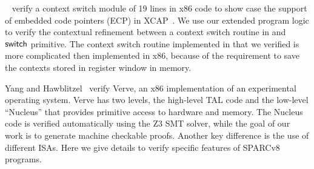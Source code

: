 ~\cite{ctxm} verify a context switch module of 19 lines
in x86 code to show case the support of embedded
code pointers (ECP) in XCAP~\cite{xcap}. 
We use our extended program logic to verify the contextual 
refinement between a context switch routine in \sparc{} 
and $\mathsf{switch}{}$ primitive. The context switch routine 
implemented in \sparc{} that we verified 
is more complicated then 
implemented in x86, because of the requirement to save 
the contexts stored in register window in memory.

Yang and Hawblitzel~\cite{YangPLDI10} verify Verve, an x86 
implementation of an experimental operating system. Verve has two 
levels, the high-level TAL code and the low-level ``Nucleus'' 
that provides primitive access to hardware and memory. 
The Nucleus code is verified automatically using the Z3 SMT solver,
while the goal of our work is to generate machine checkable proofs.
Another key difference is the use of different ISAs. Here
we give details to verify specific features of SPARCv8 programs.

